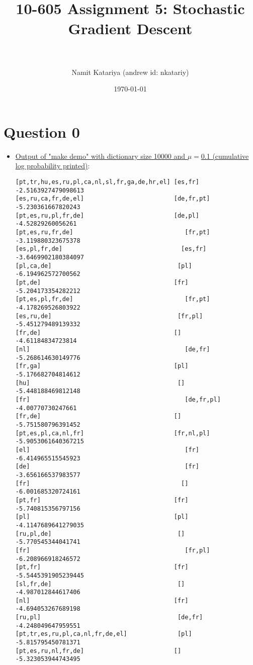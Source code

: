 \documentclass[paper=a4, fontsize=11pt]{scrartcl} %
\title{	
\normalfont \normalsize 
\horrule{0.5pt} \\[0.4cm] %
\huge{10-605 Assignment 5: Stochastic Gradient Descent} \\ %
\horrule{2pt} \\[0.5cm] %
}
\author{Namit Katariya (andrew id: nkatariy)} %
\date{\normalsize\today} %
\numberwithin{equation}{section} %
\numberwithin{figure}{section} %
\numberwithin{table}{section} %
\begin{document}
\maketitle 
\vspace*{-0.65in}
\section*{\textbf{Question 0}}

\begin{itemize}
\item \underline{Output of "make demo" with dictionary size 10000 and $\mu=$0.1 (cumulative log probability printed)}:
\begin{verbatim}
[pt,tr,hu,es,ru,pl,ca,nl,sl,fr,ga,de,hr,el]	[es,fr]	   -2.5163927479098613
[es,ru,ca,fr,de,el]	                        [de,fr,pt]	-5.230361667820243
[pt,es,ru,pl,fr,de]	                        [de,pl]	   -4.52829260056261
[pt,es,ru,fr,de]	                           [fr,pt]	   -3.119880323675378
[es,pl,fr,de]	                              [es,fr]    -3.6469902180384097
[pl,ca,de]	                                 [pl]	      -6.194962572700562
[pt,de]	                                    [fr]	      -5.204173354282212
[pt,es,pl,fr,de]	                           [fr,pt]	   -4.178269526803922
[es,ru,de]	                                 [fr,pl]	   -5.451279489139332
[fr,de]	                                    []	        -4.61184834723814
[nl]	                                       [de,fr]	   -5.268614630149776
[fr,ga]	                                    [pl]	      -5.176682704814612
[hu]                                      	 []	        -5.448188469812148
[fr]	                                       [de,fr,pl] -4.00770730247661
[fr,de]	                                    []	        -5.751580796391452
[pt,es,pl,ca,nl,fr]	                        [fr,nl,pl]	-5.9053061640367215
[el]	                                       [fr]	      -6.414965515545923
[de]	                                       [fr]	      -3.656166537983577
[fr]                                     	  []	        -6.001685320724161
[pt,fr]	                                    [fr]	      -5.740815356797156
[pl]                                       	[pl]	      -4.1147689641279035
[ru,pl,de]	                                 []	        -5.770545344041741
[fr]	                                       [fr,pl]	   -6.208966918246572
[pt,fr]	                                    [fr]	      -5.5445391905239445
[sl,fr,de]	                                 []	        -4.987012844617406
[nl]                                       	[fr]	      -4.694053267689198
[ru,pl]                                   	 [de,fr]	   -4.248049647959551
[pt,tr,es,ru,pl,ca,nl,fr,de,el]           	 [pl]	      -5.815795450781371
[pt,es,ru,nl,fr,de]	                        []	        -5.323053944743495


\end{verbatim}
\end{itemize}
\end{document}

